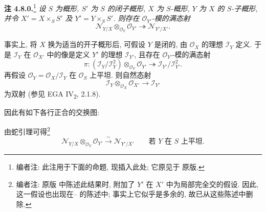 
\setcounter{footnote}{88}

\medskip
\noindent{}\textbf{注 4.8.0.}\footnote{编者注: 此注用于下面的命题, 现插入此处; 它原见于
原版.}
\textit{设 \(S\) 为概形, \(S'\) 为 \(S\) 的闭子概形,
\(X\) 为 \(S\)-概形, \(Y\) 为 \(X\) 的 \(S\)-子概形,
并令 \(X'=X\times_S S'\) 及 \(Y'=Y\times_S S'\).
则存在 \(\mathscr O_{Y'}\)-模的满态射}
\[
 \mathscr N_{Y/X}\otimes_{\mathscr O_Y}\mathscr O_{Y'}
 \twoheadrightarrow \mathscr N_{Y'/X'}.
\]

事实上, 将 \(X\) 换为适当的开子概形后,
可假设 \(Y\) 是闭的, 由 \(\mathscr O_X\) 的理想
\(\mathscr I_Y\) 定义. 于是 \(\mathscr I_Y\) 在
\(\mathscr O_{X'}\) 中的像是定义 \(Y'\) 的理想 \(\mathscr I_{Y'}\),
且存在 \(\mathscr O_{Y'}\)-模的满态射
\[
 \pi:
 (\mathscr I_Y/\mathscr I_Y^2)
 \otimes_{\mathscr O_Y}\mathscr O_{Y'}
 \twoheadrightarrow
 \mathscr I_{Y'}/\mathscr I_{Y'}^2.
\]
再假设 \(\mathscr O_Y=\mathscr O_X/\mathscr I_Y\)
在 \(\mathscr O_S\) 上平坦. 则自然态射
\[
 \mathscr I_Y\otimes_{\mathscr O_X}\mathscr O_{X'}
 \longrightarrow \mathscr I_{Y'}
\]
为双射 (参见 EGA IV\textsubscript{2}, 2.1.8).

因此有如下各行正合的交换图:

\begin{center}
\end{center}

由蛇引理可得\footnote{编者注: 原版 中陈述此结果时,
附加了 \(Y'\) 在 \(X'\) 中为局部完全交的假设.
因此, 这一假设也出现在-- 的陈述中;
事实上它似乎是多余的, 故已从这些陈述中删除.}
\begin{equation}
 \mathscr N_{Y/X}\otimes_{\mathscr O_Y}\mathscr O_{Y'}
 \xrightarrow{\sim}\mathscr N_{Y'/X'}
 \qquad\text{若 \(Y\) 在 \(S\) 上平坦.}
 \tag{4.8.0}\label{sga3:iii:remark:4-8-0:equation:4-8-0}
\end{equation}

